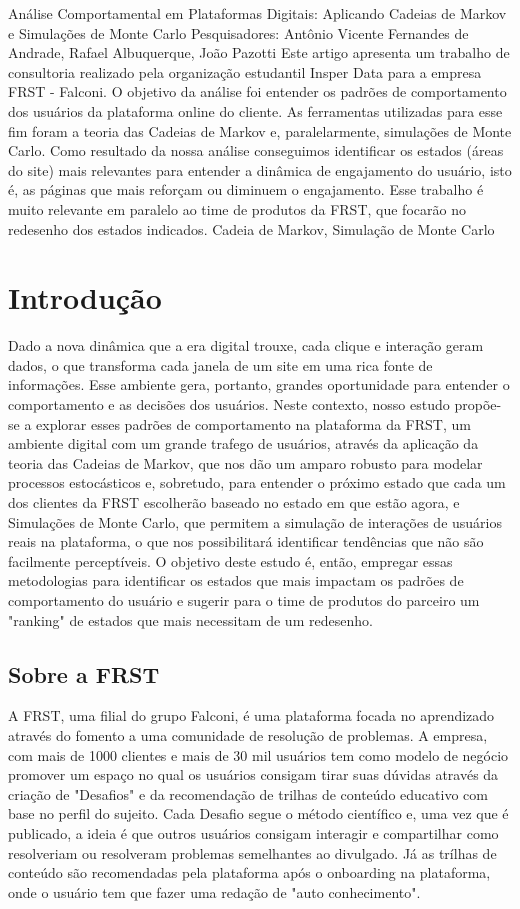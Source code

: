 \relatorio
{Análise Comportamental em Plataformas Digitais: Aplicando Cadeias de Markov e Simulações de Monte Carlo}
{
    \noindent Pesquisadores: Antônio Vicente Fernandes de Andrade, Rafael Albuquerque, João Pazotti    
}
{
    Este artigo apresenta um trabalho de consultoria realizado pela organização estudantil Insper Data para a empresa FRST - Falconi. O objetivo da análise foi entender os padrões de comportamento dos usuários da plataforma online do cliente. As ferramentas utilizadas para esse fim foram a teoria das Cadeias de Markov e, paralelarmente, simulações de Monte Carlo. Como resultado da nossa análise conseguimos identificar os estados (áreas do site) mais relevantes para entender a dinâmica de engajamento do usuário, isto é, as páginas que mais reforçam ou diminuem o engajamento. Esse trabalho é muito relevante em paralelo ao time de produtos da FRST, que focarão no redesenho dos estados indicados.
}
{Cadeia de Markov, Simulação de Monte Carlo}

\section{Introdução}
Dado a nova dinâmica que a era digital trouxe, cada clique e interação geram dados, o que transforma cada janela de um site em uma rica fonte de informações. Esse ambiente gera, portanto, grandes oportunidade para entender o comportamento e as decisões dos usuários. 
Neste contexto, nosso estudo propõe-se a explorar esses padrões de comportamento na plataforma da FRST, um ambiente digital com um grande trafego de usuários, através da aplicação da teoria das Cadeias de Markov, que nos dão um amparo robusto para modelar processos estocásticos e, sobretudo, para entender o próximo estado que cada um dos clientes da FRST escolherão baseado no estado em que estão agora, e Simulações de Monte Carlo, que permitem a simulação de interações de usuários reais na plataforma, o que nos possibilitará identificar tendências que não são facilmente perceptíveis. 
O objetivo deste estudo é, então, empregar essas metodologias para identificar os estados que mais impactam os padrões de comportamento do usuário e sugerir para o time de produtos do parceiro um "ranking" de estados que mais necessitam de um redesenho.

\subsection{Sobre a FRST}
A FRST, uma filial do grupo Falconi, é uma plataforma focada no aprendizado através do  fomento a uma comunidade de resolução de problemas. A empresa, com mais de 1000 clientes e mais de 30 mil usuários tem como modelo de negócio promover um espaço no qual os usuários consigam tirar suas dúvidas através da criação de "Desafios" e da recomendação de trilhas de conteúdo educativo com base no perfil do sujeito. 
Cada Desafio segue o método científico e, uma vez que é publicado, a ideia é que outros usuários consigam interagir e compartilhar como resolveriam ou resolveram problemas semelhantes ao divulgado. Já as trílhas de conteúdo são recomendadas pela plataforma após o onboarding na plataforma, onde o usuário tem que fazer uma redação de "auto conhecimento". 

